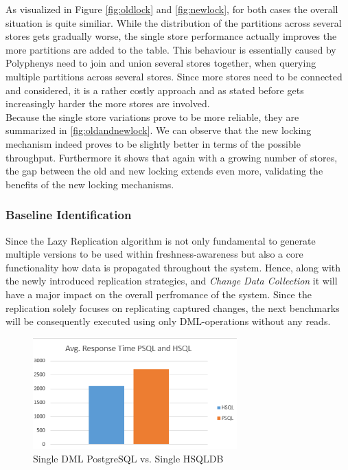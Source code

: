 As visualized in Figure \ref{fig:oldlock} and \ref{fig:newlock}, for both cases the overall situation is quite similiar.
While the distribution of the partitions across several stores gets gradually worse, the single store performance actually improves the more partitions are added to the table.
This behaviour is essentially caused by Polyphenys need to join and union several stores together, when querying multiple partitions across several stores.
Since more stores need to be connected and considered, it is a rather costly approach and as stated before gets increasingly harder the more stores are involved.\\

Because the single store variations prove to be more reliable, they are summarized in \ref{fig:oldandnewlock}.
We can observe that the new locking mechanism indeed proves to be slightly better in terms of the possible throughput.
Furthermore it shows that again with a growing number of stores, the gap between the old and new locking extends even more, validating the benefits of the new locking mechanisms.






\subsubsection{Baseline Identification} 


Since the Lazy Replication algorithm is not only fundamental to generate multiple versions to be used within freshness-awareness
but also a core functionality how data is propagated throughout the system. 
Hence, along with the newly introduced replication strategies, and \emph{Change Data Collection} it will have a major impact on the overall perfromance of the system.
Since the replication solely focuses on replicating captured changes, the next benchmarks will be consequently executed using only DML-operations without any reads.\\

\begin{figure}[t] 
    \centering 
    \includegraphics[width=0.7\textwidth]{Figures/hsql_psql.png}
    \caption{Single DML PostgreSQL vs. Single HSQLDB}
    \label{fig:singlepsqlhsql}
\end{figure}

